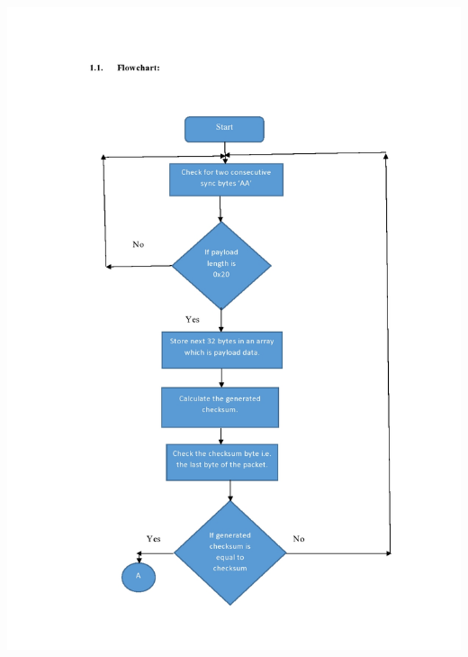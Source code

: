 \documentclass[12pt]{article}
\begin{document}
\begin{enumerate}
\begin{center}
	\graphicspath{ {images/} }
	\includegraphics[width=19cm, height=24cm]{Att_Flow1}
\end{center}
\begin{center}
	\graphicspath{ {images/} }

\end{center}
\end{enumerate}
\end{document}
